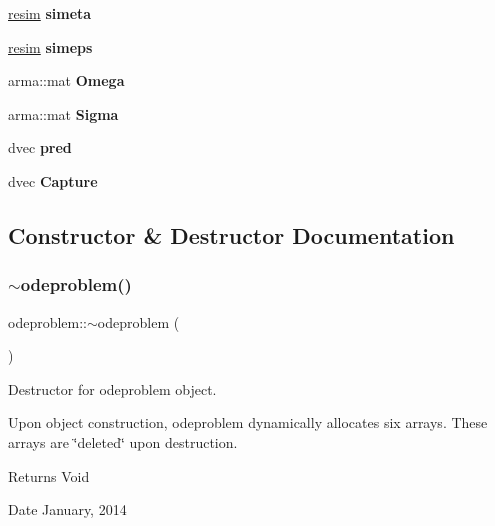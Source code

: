 \begin{DoxyCompactItemize}
\hyperlink{structresim}{resim} {\bfseries simeta}
\item 
\mbox{\label{classodeproblem_a312484a436a3bb0ea55276fa97d23fb5}} 
\hyperlink{structresim}{resim} {\bfseries simeps}
\item 
\mbox{\label{classodeproblem_a38b999143a87c562d9db57e5fb82aa83}} 
arma\+::mat {\bfseries Omega}
\item 
\mbox{\label{classodeproblem_ada2a77ef3f99c53d24e64026f356b99d}} 
arma\+::mat {\bfseries Sigma}
\item 
\mbox{\label{classodeproblem_a2f93a3e1c10c2d1bba1a359bb3321cc0}} 
dvec {\bfseries pred}
\item 
\mbox{\label{classodeproblem_a4244e3ca9e9d52598d776c45fbb18ca4}} 
dvec {\bfseries Capture}
\end{DoxyCompactItemize}


\subsection{Constructor \& Destructor Documentation}
\mbox{\label{classodeproblem_a00c35020fc03286fd4596f25b3d82e34}} 
\subsubsection{\texorpdfstring{$\sim$odeproblem()}{~odeproblem()}}
{\footnotesize\ttfamily odeproblem\+::$\sim$odeproblem (\begin{DoxyParamCaption}{ }\end{DoxyParamCaption})\hspace{0.3cm}{\ttfamily [virtual]}}



Destructor for odeproblem object. 

Upon object construction, odeproblem dynamically allocates six arrays. These arrays are \char`\"{}deleted\char`\"{} upon destruction.

\begin{DoxyReturn}{Returns}
Void 
\end{DoxyReturn}
\begin{DoxyDate}{Date}
January, 2014 
\end{DoxyDate}



